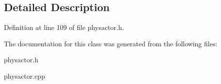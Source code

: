\subsection{Detailed Description}


Definition at line 109 of file physactor.h.

The documentation for this class was generated from the following files:\begin{DoxyCompactItemize}
\item 
physactor.h\item 
physactor.cpp\end{DoxyCompactItemize}
